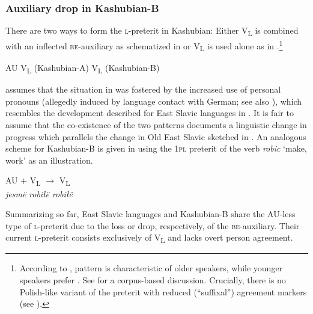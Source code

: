 \documentclass[output=paper]{langscibook}
\begin{document}

\subsubsection{Auxiliary drop in Kashubian-B}\label{pitsch:sec:Kashubian}\largerpage

There are two ways to form the \textsc{l-}preterit in Kashubian: Either V\textsubscript{L} is combined with an inflected \textsc{be}-auxiliary as schematized in  or V\textsubscript{L} is used alone as in  \citep[see][130--134]{BrezaTreder1981}.\footnote{According to \citet[776]{Stone1993}, pattern  is characteristic of older speakers, while younger speakers prefer . See \citet{Menzel2013} for a corpus-based discussion. Crucially, there is no Polish-like variant of the preterit with reduced (``suffixal'') agreement markers (see ).}

\ea
\ea AU V\textsubscript{L} \hfill (Kashubian-A) \label{pitsch:ex:definition_KashubianA}
\ex V\textsubscript{L} \hfill (Kashubian-B) \label{pitsch:ex:definition_KashubianB} 
\z\z


\noindent \citet[100]{Rittel1970} assumes that the situation in  was fostered by the increased use of personal pronouns (allegedly induced by language contact with German; see also \citealt{Nomachi2014}), which resembles the development described for East Slavic languages in . It is fair to assume that the co-existence of the two patterns documents a linguistic change in progress which parallels the change in Old East Slavic sketched in . An analogous scheme for Kashubian-B is given in  using the \textsc{1pl} preterit of the verb \textit{robic} `make, work' as an illustration.

\ea 
\gll AU $+$ V\textsubscript{L} $\longrightarrow$ V\textsubscript{L} \\
\textit{jesmë} {} \textit{robiłë} {} \textit{robiłë} \\
\label{pitsch:ex:Kashubian_Perfect}
\z

\noindent Summarizing so far, East Slavic languages and Kashubian-B share the AU-less type of \textsc{l-}preterit due to the loss or drop, respectively, of the \textsc{be}-auxiliary. Their current \textsc{l-}preterit consists exclusively of V\textsubscript{L} and lacks overt person agreement.
\end{document}
